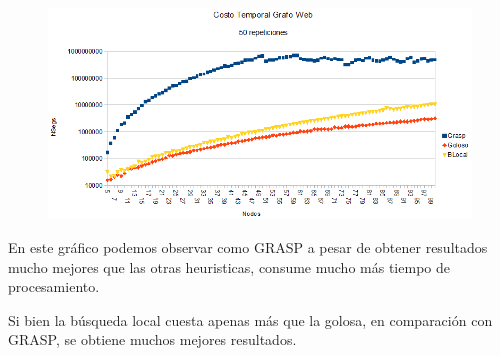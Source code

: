 \begin{figure}[H]
	\centering
	\includegraphics[scale=0.6]{timingWeb.png}
\end{figure}

\quad

\quad En este gráfico podemos observar como GRASP a pesar de obtener resultados mucho mejores que las otras heuristicas, consume mucho más tiempo de procesamiento.

\quad

\quad Si bien la búsqueda local cuesta apenas más que la golosa, en comparación con GRASP, se obtiene muchos mejores resultados.
